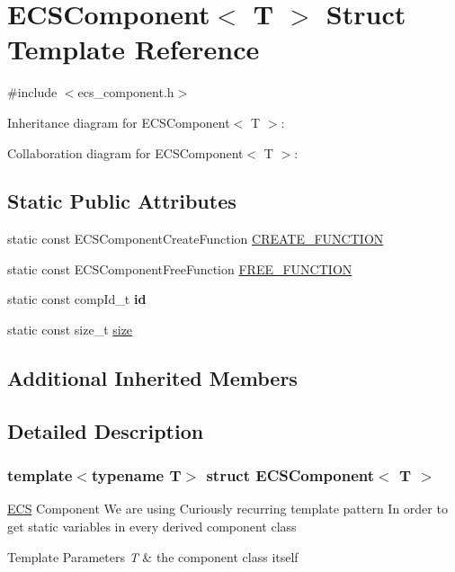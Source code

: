 \hypertarget{structECSComponent}{}\section{E\+C\+S\+Component$<$ T $>$ Struct Template Reference}
\label{structECSComponent}


{\ttfamily \#include $<$ecs\+\_\+component.\+h$>$}



Inheritance diagram for E\+C\+S\+Component$<$ T $>$\+:


Collaboration diagram for E\+C\+S\+Component$<$ T $>$\+:
\subsection*{Static Public Attributes}
\begin{DoxyCompactItemize}
\item 
static const E\+C\+S\+Component\+Create\+Function \hyperlink{structECSComponent_a0f13ee7a0f2f40ceb48f2e7739ee081f}{C\+R\+E\+A\+T\+E\+\_\+\+F\+U\+N\+C\+T\+I\+ON}
\item 
static const E\+C\+S\+Component\+Free\+Function \hyperlink{structECSComponent_a83c38574e296ac5e057c33d589f420ad}{F\+R\+E\+E\+\_\+\+F\+U\+N\+C\+T\+I\+ON}
\item 
\mbox{\label{structECSComponent_a78eca5a7028a771877355bbe0c57124e}} 
static const comp\+Id\+\_\+t {\bfseries id}
\item 
static const size\+\_\+t \hyperlink{structECSComponent_a307a02bf9d5ea085acc38b6842e6dadf}{size}
\end{DoxyCompactItemize}
\subsection*{Additional Inherited Members}


\subsection{Detailed Description}
\subsubsection*{template$<$typename T$>$\newline
struct E\+C\+S\+Component$<$ T $>$}

\hyperlink{classECS}{E\+CS} Component We are using \textquotesingle{}Curiously recurring template pattern\textquotesingle{} In order to get static variables in every derived component class 
\begin{DoxyTemplParams}{Template Parameters}
{\em T} & the component class itself \\
\hline
\end{DoxyTemplParams}


